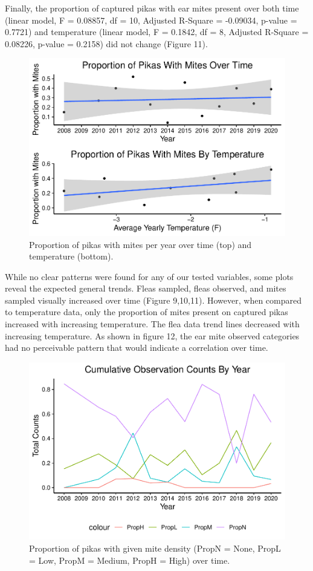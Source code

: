 \documentclass[
  12pt,
]{article}
\begin{document}
Finally, the proportion of captured pikas with ear mites present over
both time (linear model, F = 0.08857, df = 10, Adjusted R-Square =
-0.09034, p-value = 0.7721) and temperature (linear model, F = 0.1842,
df = 8, Adjusted R-Square = 0.08226, p-value = 0.2158) did not change
(Figure 11).

\begin{figure}
\centering
\includegraphics{FreedmanDye_ENV872_Project_files/figure-latex/unnamed-chunk-10-1.pdf}
\caption{Proportion of pikas with mites per year over time (top) and
temperature (bottom).}
\end{figure}

While no clear patterns were found for any of our tested variables, some
plots reveal the expected general trends. Fleas sampled, fleas observed,
and mites sampled visually increased over time (Figure 9,10,11).
However, when compared to temperature data, only the proportion of mites
present on captured pikas increased with increasing temperature. The
flea data trend lines decreased with increasing temperature. As shown in
figure 12, the ear mite observed categories had no perceivable pattern
that would indicate a correlation over time.

\begin{figure}
\centering
\includegraphics{FreedmanDye_ENV872_Project_files/figure-latex/unnamed-chunk-11-1.pdf}
\caption{Proportion of pikas with given mite density (PropN = None,
PropL = Low, PropM = Medium, PropH = High) over time.}
\end{figure}
\end{document}
